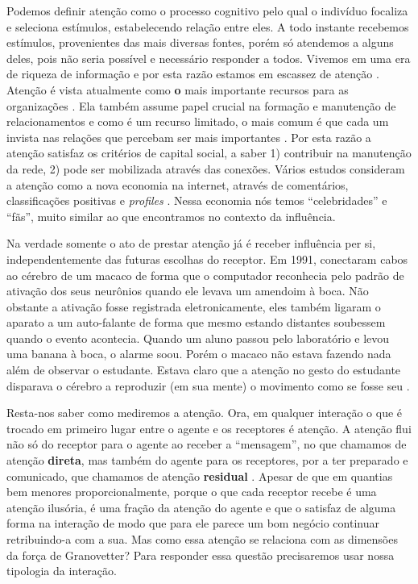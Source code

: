 Podemos definir atenção como o processo cognitivo pelo qual o indivíduo focaliza
e seleciona estímulos, estabelecendo relação entre eles. A todo instante
recebemos estímulos, provenientes das mais diversas fontes, porém só atendemos a
alguns deles, pois não seria possível e necessário responder a todos. Vivemos em
uma era de riqueza de informação e por esta razão estamos em escassez de atenção
\citep{Goldhaber1997}. Atenção é vista atualmente como \textbf{o} mais importante
recursos para as organizações \citep{Davenport2001}. Ela também assume papel
crucial na formação e manutenção de relacionamentos e como é um recurso limitado,
o mais comum é que cada um invista nas relações que percebam ser mais importantes
\citep{Dindia1993}. Por esta razão a atenção satisfaz os critérios de capital
social, a saber 1) contribuir na manutenção da rede, 2) pode ser mobilizada
através das conexões. Vários estudos consideram a atenção como a nova economia na
internet, através de comentários, classificações positivas e \textit{profiles}
\citep{Humphreys2009, Wu2009, Skageby2009}. Nessa economia nós temos
``celebridades'' e ``fãs'', muito similar ao que encontramos no contexto da
influência.

Na verdade somente o ato de prestar atenção já é receber influência per si,
independentemente das futuras escolhas do receptor. Em 1991,
\citeauthor{Rizzolatti1996} conectaram cabos ao cérebro de um macaco de forma que
o computador reconhecia pelo padrão de ativação dos seus neurônios quando ele
levava um amendoim à boca. Não obstante a ativação fosse registrada
eletronicamente, eles também ligaram o aparato a um auto-falante de forma que
mesmo estando distantes soubessem quando o evento acontecia. Quando um aluno
passou pelo laboratório e levou uma banana à boca, o alarme soou. Porém o macaco
não estava fazendo nada além de observar o estudante. Estava claro que a atenção
no gesto do estudante disparava o cérebro a reproduzir (em sua mente) o movimento
como se fosse seu \citep{Goldhaber2006}.

Resta-nos saber como mediremos a atenção. Ora, em qualquer interação o que é
trocado em primeiro lugar entre o agente e os receptores é atenção. A atenção
flui não só do receptor para o agente ao receber a ``mensagem'', no que chamamos
de atenção \textbf{direta}, mas também do agente para os receptores, por a ter
preparado e comunicado, que chamamos de atenção \textbf{residual}
\citep{Goldhaber1997}. Apesar de que em quantias bem menores proporcionalmente,
porque o que cada receptor recebe é uma atenção ilusória, é uma fração da
atenção do agente e que o satisfaz de alguma forma na interação de modo que para
ele parece um bom negócio continuar retribuindo-a com a sua. Mas como essa
atenção se relaciona com as dimensões da força de Granovetter? Para responder
essa questão precisaremos usar nossa tipologia da interação.

